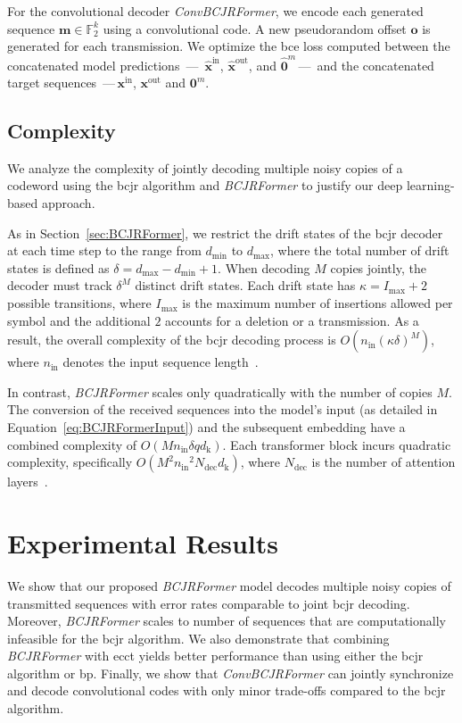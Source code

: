 \documentclass[conference,letterpaperu]{IEEEtran}
\newcommand{\yin}{\ensuremath{\bm{x}^{\text{in}}}}
\newcommand{\yout}{\ensuremath{\bm{x}^{\text{out}}}}
\newcommand{\mess}{\ensuremath{\bm{m}}}
\newcommand{\nin}{\ensuremath{n_{\text{in}}}}
\newcommand{\predyout}{\ensuremath{\bm{\hat{x}}^{\text{out}}}}
\newcommand{\predyin}{\ensuremath{\bm{\hat{x}}^{\text{in}}}}
\newcommand{\dfrom}{\ensuremath{d}}
\newcommand{\alphabetSize}{\ensuremath{q}}
\newcommand{\offset}{\ensuremath{\bm{o}}}
\newcommand{\Ndec}{\ensuremath{N_{\text{dec}}}}
\newcommand{\hiddenDim}{\ensuremath{d_{\text{k}}}}
\begin{document}
For the convolutional decoder \textit{ConvBCJRFormer}, we encode each generated sequence $\mess \in \mathbb{F}_2^k$ using a convolutional code. A new pseudorandom offset $\offset$ is generated for each transmission. We optimize the \ac{bce} loss computed between the concatenated model predictions \,---\, $\predyin$, $\predyout$, and $\hat{\bm{0}}^m$\,---\, and the concatenated target sequences \,---\,$\yin$, $\yout$ and $\bm{0}^m$. 

\subsection{Complexity}
We analyze the complexity of jointly decoding multiple noisy copies of a codeword using the \ac{bcjr} algorithm and \textit{BCJRFormer} to justify our deep learning-based approach. 

As in Section~\ref{sec:BCJRFormer}, we restrict the drift states of the \ac{bcjr} decoder at each time step to the range from \(d_{\min}\) to \(d_{\max}\), where the total number of drift states is defined as $\delta = \dfrom_{\max} - \dfrom_{\min} + 1$.
When decoding \(M\) copies jointly, the decoder must track \(\delta^M\) distinct drift states. Each drift state has \(\kappa = I_{\max} + 2\) possible transitions, where \(I_{\max}\) is the maximum number of insertions allowed per symbol and the additional $2$ accounts for a deletion or a transmission. As a result, the overall complexity of the \ac{bcjr} decoding process is \(O(\nin (\kappa \delta)^M)\), where \(\nin\) denotes the input sequence length~\cite{maaroufConcatenatedCodesMultiple2023a}.

In contrast, \textit{BCJRFormer} scales only quadratically with the number of copies $M$. The conversion of the received sequences into the model's input (as detailed in Equation~\eqref{eq:BCJRFormerInput}) and the subsequent embedding have a combined complexity of $O(M\nin\delta\alphabetSize \hiddenDim)$. Each transformer block incurs quadratic complexity, specifically \(O\left(M^2 \nin^2 \Ndec \hiddenDim\right)\), where \(\Ndec\) is the number of attention layers~\cite{vaswaniAttentionAllYou2017a}.


\section{Experimental Results}

We show that our proposed \textit{BCJRFormer} model decodes multiple noisy copies of transmitted sequences with error rates comparable to joint \ac{bcjr} decoding. Moreover, \textit{BCJRFormer} scales to number of sequences that are computationally infeasible for the \ac{bcjr} algorithm. We also demonstrate that combining \textit{BCJRFormer} with \ac{ecct} yields better performance than using either the \ac{bcjr} algorithm or \ac{bp}. Finally, we show that \textit{ConvBCJRFormer} can jointly synchronize and decode convolutional codes with only minor trade-offs compared to the \ac{bcjr} algorithm. 
\end{document}
